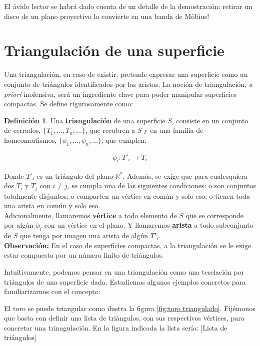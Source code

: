 \documentclass[a4paper,11pt,spanish, twoside, leqno]{tfg-uam}
\theoremstyle{definition}
\newtheorem{defin}[teor]{Definici\'on}
\begin{document}
El ávido lector se habrá dado cuenta de un detalle de la demostración: retirar un disco de un plano proyectivo lo convierte en una banda de M\"obius!


\section{Triangulación de una superficie}
Una triangulación, en caso de existir, pretende expresar una superficie como un conjunto de triángulos identificados por las aristas. La noción de triangulación, \textit{a priori} inofensiva, será un ingrediente clave para poder manipular superficies compactas. Se define rigurosamente como:

\begin{defin}\label{defin:triangulacion}
Una \textbf{triangulación} de una superficie $S$, consiste en un conjunto de cerrados, $\{T_1, ..., T_n, ...\}$, que recubren a $S$ y en una familia de homeomorfismos, $\{\phi_1, ..., \phi_n, ...\}$, que cumplen:

\begin{align*}
	\phi_i: T'_i \longrightarrow T_i
\end{align*}

Donde $T'_i$ es un triángulo del plano $\mathbb{R}^2$.
Además, se exige que para cualesquiera dos $T_i$ y $T_j$ con $i\neq j$, se cumpla una de las siguientes condiciones: o son conjuntos totalmente disjuntos; o comparten un vértice en común y solo eso; o tienen toda una arista en común y solo eso.\\
Adicionalmente, llamaremos \textbf{vértice} a todo elemento de $S$ que se corresponde por algún $\phi_i$ con un vértice en el plano. Y llamaremos \textbf{arista} a todo subconjunto de $S$ que tenga por imagen una arista de algún $T'_i$.\\
\textbf{Observación:} En el caso de superficies compactas, a la triangulación se le exige estar compuesta por un número finito de triángulos.
\end{defin}


Intuitivamente, podemos pensar en una triangulación como una teselación por triángulos de una superficie dada. Estudiemos algunos ejemplos concretos para familiarizarnos con el concepto:

El toro se puede triangular como ilustra la figura  \ref{fig:toro triangulado}. Fijémonos que basta con definir una lista de triángulos, con sus respectivos vértices, para concretar una trinagulación. En la figura indicada la lista sería:
[Lista de triángulos]
\end{document}
